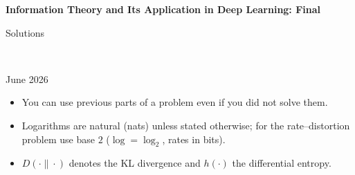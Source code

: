 \documentclass[12pt]{article}
\begin{document}
\begin{center}
{\bf Information Theory and Its Application in Deep Learning: Final \begin{solution}Solutions\end{solution}} \\ \medskip
\begin{problem}June 2026 \end{problem}
\end{center}

\begin{problem}
\noindent
\begin{itemize}
\item You can use previous parts of a problem even if you did not solve them.
\item Logarithms are natural (nats) unless stated otherwise; for the rate--distortion problem use base $2$ ($\log = \log_2$, rates in bits).
\item $D(\cdot\|\cdot)$ denotes the KL divergence and $h(\cdot)$ the differential entropy.
\end{itemize}
\end{problem}
\begin{solution}
\end{solution}

\end{document}
